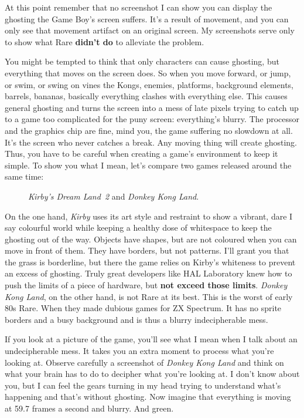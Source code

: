 \documentclass{book}
\begin{document}
At this point remember that no screenshot I can show you can display the ghosting the Game Boy’s screen suffers. It’s a result of movement, and you can only see that movement artifact on an original screen. My screenshots serve only to show what Rare \textbf{didn’t do} to alleviate the problem.\par
You might be tempted to think that only characters can cause ghosting, but everything that moves on the screen does. So when you move forward, or jump, or swim, or swing on vines the Kongs, enemies, platforms, background elements, barrels, bananas, basically everything clashes with everything else. This causes general ghosting and turns the screen into a mess of late pixels trying to catch up to a game too complicated for the puny screen: everything’s blurry. The processor and the graphics chip are fine, mind you, the game suffering no slowdown at all. It’s the screen who never catches a break. Any moving thing will create ghosting. Thus, you have to be careful when creating a game’s environment to keep it simple. To show you what I mean, let’s compare two games released around the same time:\par
\FloatBarrier\vspace{\baselineskip}\begin{figure}[H]\caption*{\emph{Kirby’s Dream Land~2} and \emph{Donkey Kong Land}.}\end{figure}
On the one hand, \emph{Kirby} uses its art style and restraint to show a vibrant, dare I say colourful world while keeping a healthy dose of whitespace to keep the ghosting out of the way. Objects have shapes, but are not coloured when you can move in front of them. They have borders, but not patterns. I’ll grant you that the grass is borderline, but there the game relies on Kirby’s whiteness to prevent an excess of ghosting. Truly great developers like HAL Laboratory knew how to push the limits of a piece of hardware, but \textbf{not exceed those limits}. \emph{Donkey Kong Land}, on the other hand, is not Rare at its best. This is the worst of early 80s Rare. When they made dubious games for ZX Spectrum. It has no sprite borders and a busy background and is thus a blurry indecipherable mess.\par
If you look at a picture of the game, you’ll see what I mean when I talk about an undecipherable mess. It takes you an extra moment to process what you’re looking at. Observe carefully a screenshot of \emph{Donkey Kong Land} and think on what your brain has to do to decipher what you’re looking at. I don’t know about you, but I can feel the gears turning in my head trying to understand what’s happening and that’s without ghosting. Now imagine that everything is moving at 59.7 frames a second and blurry. And green.\par
\end{document}
